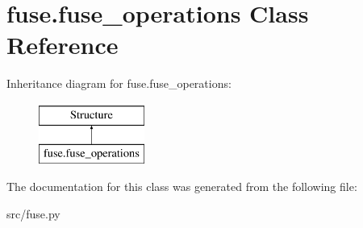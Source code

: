 \hypertarget{classfuse_1_1fuse__operations}{\section{fuse.\-fuse\-\_\-operations Class Reference}
\label{classfuse_1_1fuse__operations}
}
Inheritance diagram for fuse.\-fuse\-\_\-operations\-:\begin{figure}[H]
\begin{center}
\leavevmode
\includegraphics[height=2.000000cm]{classfuse_1_1fuse__operations}
\end{center}
\end{figure}


The documentation for this class was generated from the following file\-:\begin{DoxyCompactItemize}
\item 
src/fuse.\-py\end{DoxyCompactItemize}
